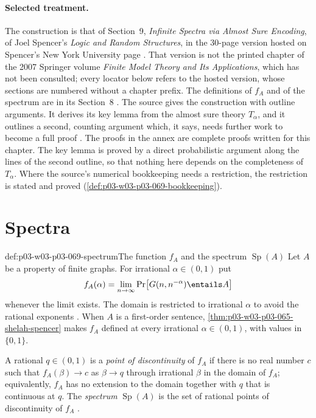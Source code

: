 \paragraph{Selected treatment.}
The construction is that of Section~9, \emph{Infinite Spectra via Almost Sure
Encoding}, of Joel Spencer's \emph{Logic and Random Structures}, in the
30-page version hosted on Spencer's New York University page
\cite[pp.~16--18]{Spencer2007LogicRandomStructuresAuthor}.  That version is
not the printed chapter of the 2007 Springer volume \emph{Finite Model Theory
and Its Applications}, which has not been consulted; every locator below
refers to the hosted version, whose sections are numbered without a chapter
prefix.  The definitions of \(f_A\) and of the spectrum are in its Section~8
\cite[p.~15]{Spencer2007LogicRandomStructuresAuthor}.  The source gives the
construction with outline arguments.  It derives its key lemma from the
almost sure theory \(T_\alpha\), and it outlines a second, counting argument
which, it says, needs further work to become a full proof
\cite[p.~17]{Spencer2007LogicRandomStructuresAuthor}.  The proofs in the
annex are complete proofs written for this chapter.  The key lemma is proved
by a direct probabilistic argument along the lines of the second outline, so
that nothing here depends on the completeness of \(T_\alpha\).  Where the
source's numerical bookkeeping needs a restriction, the restriction is stated
and proved (\cref{def:p03-w03-p03-069-bookkeeping}).

\section{Spectra}
\label{sec:p03-w03-p03-069-spectra}

\begin{hbdefinition}{def:p03-w03-p03-069-spectrum}{The function \(f_A\) and the spectrum \(\operatorname{Sp}(A)\)}
Let \(A\) be a property of finite graphs.  For irrational \(\alpha\in(0,1)\)
put
\[
  f_A(\alpha)=\lim_{n\to\infty}\Pr\bigl[G(n,n^{-\alpha})\entails A\bigr]
\]
whenever the limit exists.  The domain is restricted to irrational
\(\alpha\) to avoid the rational exponents
\cite[p.~15]{Spencer2007LogicRandomStructuresAuthor}.  When \(A\) is a
first-order sentence, \cref{thm:p03-w03-p03-065-shelah-spencer} makes
\(f_A\) defined at every irrational \(\alpha\in(0,1)\), with values in
\(\{0,1\}\).

A rational \(q\in(0,1)\) is a \emph{point of discontinuity} of \(f_A\) if
there is no real number \(c\) such that \(f_A(\beta)\to c\) as \(\beta\to q\)
through irrational \(\beta\) in the domain of \(f_A\); equivalently, \(f_A\)
has no extension to the domain together with \(q\) that is continuous at
\(q\).  The \emph{spectrum} \(\operatorname{Sp}(A)\) is the set of rational
points of discontinuity of \(f_A\)
\cite[p.~15]{Spencer2007LogicRandomStructuresAuthor}.
\end{hbdefinition}

